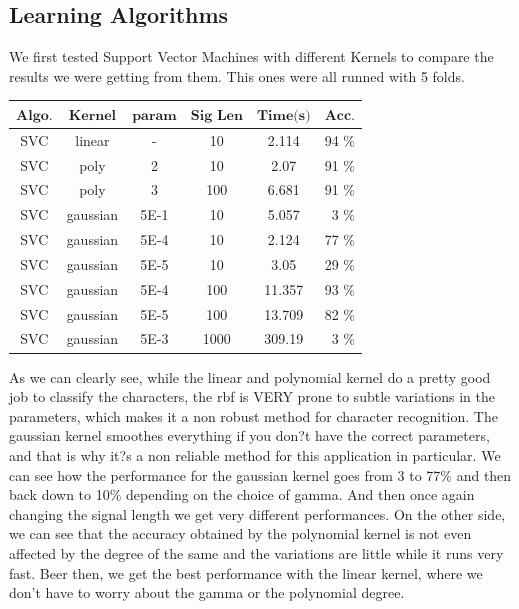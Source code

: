 \documentclass{article}
\begin{document}
\subsection{Learning Algorithms}
We first tested Support Vector Machines with different Kernels to compare the results we were getting from them. This ones were all runned with 5 folds.

\begin{center}
    \begin{tabular}{ | c | c | c | c | c | r |}
    \hline
    $\textbf{Algo.}$ & $\textbf{Kernel}$  & $\textbf{param}$ & $\textbf{Sig Len}$ & $\textbf{Time(s)}$ & $\textbf{Acc.}$ \\ \hline
    SVC & linear & - & 10 & 2.114 & 94 $\%$ \\ \hline
    SVC & poly & 2 & 10 & 2.07 & 91 $\%$ \\ \hline
    SVC & poly & 3 & 100 & 6.681 & 91 $\%$ \\ \hline
    SVC & gaussian & 5E-1 & 10 & 5.057 & 3 $\%$ \\ \hline
    SVC & gaussian & 5E-4 & 10 & 2.124 & 77 $\%$ \\ \hline
    SVC & gaussian & 5E-5 & 10 & 3.05 & 29 $\%$ \\ \hline
    SVC & gaussian & 5E-4 & 100 & 11.357 & 93 $\%$ \\ \hline
    SVC & gaussian & 5E-5 & 100 & 13.709 & 82 $\%$ \\ \hline
    SVC & gaussian & 5E-3 & 1000 & 309.19 & 3 $\%$ \\ \hline
    
    \end{tabular}
\end{center}

As we can clearly see, while the linear and polynomial kernel do a pretty good job to classify the characters, the rbf is VERY prone to subtle variations in the parameters, which makes it a non robust method for character recognition. The gaussian kernel smoothes everything if you don?t have the correct parameters, and that is why it?s a non reliable method for this application in particular. We can see how the performance for the gaussian kernel goes from 3 to 77\% and then back down to 10\% depending on the choice of gamma. And then once again changing the signal length we get very different performances.
On the other side, we can see that the accuracy obtained by the polynomial kernel is not even affected by the degree of the same and the variations are little while it runs very fast. Beer then, we get the best performance with the linear kernel, where we don't have to worry about the gamma or the polynomial degree.
\end{document}

